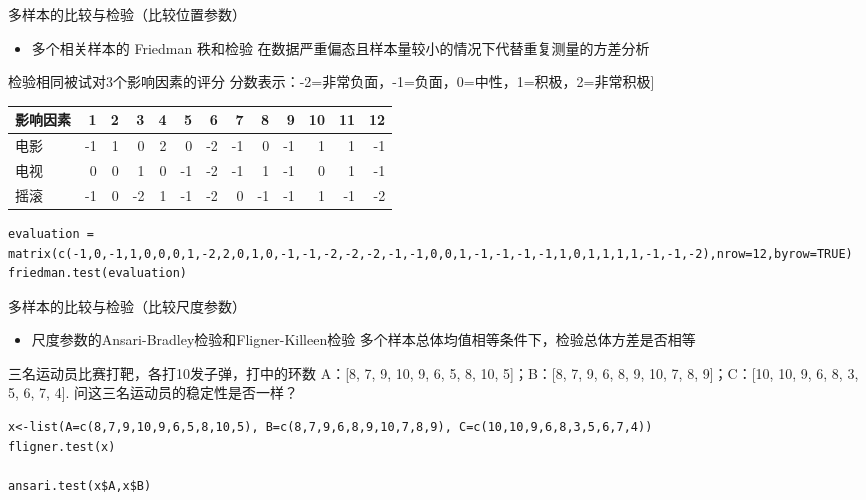 \documentclass[presentation]{beamer}
\begin{document}
\begin{frame}[fragile,label={sec:org2b5bfc2}]{多样本的比较与检验（比较位置参数）}
 \begin{itemize}
\item 多个相关样本的 Friedman 秩和检验  
在数据严重偏态且样本量较小的情况下代替重复测量的方差分析
\end{itemize}

检验相同被试对3个影响因素的评分  
分数表示：-2=非常负面，-1=负面，0=中性，1=积极，2=非常积极]

\begin{center}
\begin{tabular}{lrrrrrrrrrrrr}
影响因素 & 1 & 2 & 3 & 4 & 5 & 6 & 7 & 8 & 9 & 10 & 11 & 12\\
\hline
电影 & -1 & 1 & 0 & 2 & 0 & -2 & -1 & 0 & -1 & 1 & 1 & -1\\
电视 & 0 & 0 & 1 & 0 & -1 & -2 & -1 & 1 & -1 & 0 & 1 & -1\\
摇滚 & -1 & 0 & -2 & 1 & -1 & -2 & 0 & -1 & -1 & 1 & -1 & -2\\
\end{tabular}
\end{center}
\begin{verbatim}
evaluation = matrix(c(-1,0,-1,1,0,0,0,1,-2,2,0,1,0,-1,-1,-2,-2,-2,-1,-1,0,0,1,-1,-1,-1,-1,1,0,1,1,1,1,-1,-1,-2),nrow=12,byrow=TRUE)
friedman.test(evaluation)
\end{verbatim}
\end{frame}


\begin{frame}[fragile,label={sec:org745196a}]{多样本的比较与检验（比较尺度参数）}
 \begin{itemize}
\item 尺度参数的Ansari-Bradley检验和Fligner-Killeen检验  
多个样本总体均值相等条件下，检验总体方差是否相等
\end{itemize}

三名运动员比赛打靶，各打10发子弹，打中的环数 A：[8, 7, 9, 10, 9, 6, 5, 8, 10, 5]；B：[8, 7, 9, 6, 8, 9, 10, 7, 8, 9]；C：[10, 10, 9, 6, 8, 3, 5, 6, 7, 4]. 问这三名运动员的稳定性是否一样？
\begin{verbatim}
x<-list(A=c(8,7,9,10,9,6,5,8,10,5), B=c(8,7,9,6,8,9,10,7,8,9), C=c(10,10,9,6,8,3,5,6,7,4))
fligner.test(x)

ansari.test(x$A,x$B)
\end{verbatim}
\end{frame}
\end{document}
